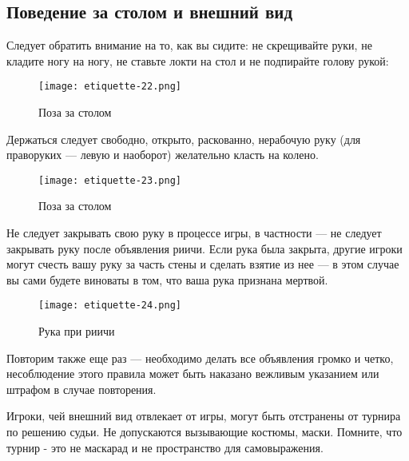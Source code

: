 \subsection{Поведение за столом и внешний вид}

Следует обратить внимание на то, как вы сидите: не скрещивайте руки, не кладите ногу на ногу, не ставьте локти на стол и не подпирайте голову рукой:

\begin{figure}[H]
	\centering
	\texttt{[image: etiquette-22.png]}
	\caption{Поза за столом}
\end{figure}

Держаться следует свободно, открыто, раскованно, нерабочую руку (для праворуких — левую и наоборот) желательно класть на колено.

\begin{figure}[H]
	\centering
	\texttt{[image: etiquette-23.png]}
	\caption{Поза за столом}
\end{figure}

Не следует закрывать свою руку в процессе игры, в частности --- не следует закрывать руку после объявления риичи. Если рука была закрыта, другие игроки могут счесть вашу руку за часть стены и сделать взятие из нее --- в этом случае вы сами будете виноваты в том, что ваша рука признана мертвой.

\begin{figure}[H]
	\centering
	\texttt{[image: etiquette-24.png]}
	\caption{Рука при риичи}
\end{figure}

Повторим также еще раз --- необходимо делать все объявления громко и четко, несоблюдение этого правила может быть наказано вежливым указанием или штрафом в случае повторения.

Игроки, чей внешний вид отвлекает от игры, могут быть отстранены от турнира по решению судьи. Не допускаются вызывающие костюмы, маски. Помните, что турнир - это не маскарад и не пространство для самовыражения.
